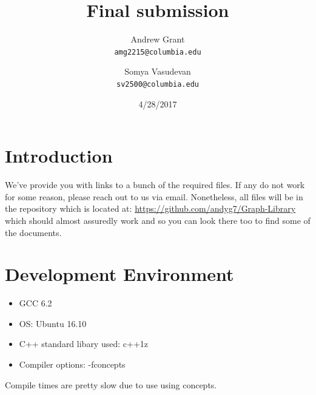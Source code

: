 \documentclass{article}
\title{Final submission}
\author{
Andrew Grant\\
\texttt{amg2215@columbia.edu}
\and
 Somya Vasudevan \\
 \texttt{sv2500@columbia.edu}
}
\date{4/28/2017}
\begin{document}
\maketitle

\tableofcontents

\section{Introduction}
We've provide you with links to a bunch of the required files. If any do not work for some reason, please reach out to us via email. Nonetheless, all files will be in the repository which is located at:  \url{https://github.com/andyg7/Graph-Library} which should almost assuredly work and so you can look there too to find some of the documents.
\par
\section{Development Environment}
\begin{itemize}
\item GCC 6.2
\item OS: Ubuntu 16.10
\item C++ standard libary used: c++1z
\item Compiler options: -fconcepts
\end{itemize}
Compile times are pretty slow due to use using concepts.
\end{document}
